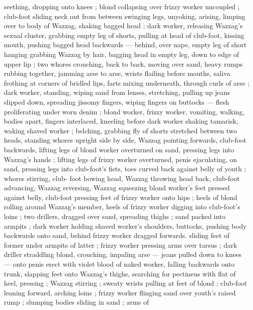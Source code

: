 seething, dropping onto knees ; blond collapsing over frizzy worker 
uncoupled ; club-foot sliding neck out from between swinging legs, 
unyoking, arising, limping over to body of Wazzag, shaking bagged 
head ; dark worker, releasing Wazzag's sexual cluster, grabbing 
empty leg of shorts, pulling at head of club-foot, kissing mouth, 
pushing bagged head backwards --- behind, over nape, empty leg of 
short hanging {\dashcom} grabbing Wazzag by hair, bagging head in empty 
leg, down to edge of upper lip ; two whores crouching, back to back, 
moving over sand, heavy rumps rubbing together, jamming arse to 
arse, wrists flailing before mouths, saliva frothing at corners of 
bridled lips, farts mixing underneath, through curls of arse ; dark 
worker, standing, wiping sand from lenses, stretching, pulling up 
jeans slipped down, spreading jissomy fingers, wiping fingers on 
buttocks --- flesh proliferating under worn denim ; blond worker, 
frizzy worker, vomiting, walking, bodies apart, fingers interlaced, 
kneeling before dark worker shaking tamarisk, waking shaved worker 
; belching, grabbing fly of shorts stretched between two heads, 
standing whores upright side by side, Wazzag pointing forwards, 
club-foot backwards, lifting legs of blond worker overturned on 
sand, pressing legs into Wazzag's hands ; lifting legs of frizzy worker 
overturned, penis ejaculating, on sand, pressing legs into club-foot's 
fists, toes curved back against belly of youth ; whores stirring, club- 
foot bowing head, Wazzag throwing head back, club-foot advancing, 
Wazzag reversing, Wazzag squeezing blond worker's feet pressed 
against belly, club-foot pressing feet of frizzy worker onto hips ; 
heels of blond rolling around Wazzag's member, heels of frizzy 
worker digging into club-foot's loins ; two drillers, dragged over 
sand, spreading thighs ; sand packed into armpits ; dark worker 
holding shaved worker's shoulders, buttocks, pushing body 
backwards onto sand, behind frizzy worker dragged forwards. sliding 
feet of former under armpits of latter ; frizzy worker pressing arms 
over tarsus ; dark driller straddling blond, crouching, impaling arse 
--- jeans pulled down to knees --- onto penis erect with violet blood 
of naked worker, falling backwards onto  trunk, slapping feet 
onto Wazzag's thighs, searching for pectineus with flat of heel, 
pressing ; Wazzag stirring ; sweaty wrists pulling at feet of blond ;
club-foot leaning forward, arching loins ; frizzy worker flinging sand 
over youth's raised rump ; slumping bodies sliding in sand ; arms of 
